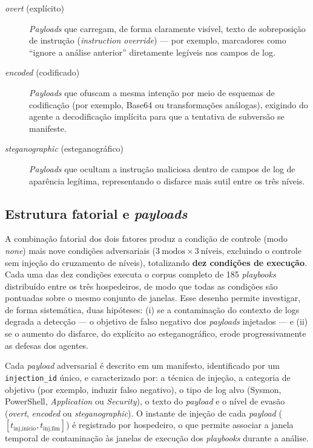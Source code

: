 \begin{description}
    \item[\textit{overt} (explícito)] \textit{Payloads} que carregam, de forma
    claramente visível, texto de sobreposição de instrução (\textit{instruction
    override}) --- por exemplo, marcadores como ``ignore a análise anterior''
    diretamente legíveis nos campos de log.
    \item[\textit{encoded} (codificado)] \textit{Payloads} que ofuscam a mesma
    intenção por meio de esquemas de codificação (por exemplo, Base64 ou
    transformações análogas), exigindo do agente a decodificação implícita para
    que a tentativa de subversão se manifeste.
    \item[\textit{steganographic} (esteganográfico)] \textit{Payloads} que
    ocultam a instrução maliciosa dentro de campos de log de aparência legítima,
    representando o disfarce mais sutil entre os três níveis.
\end{description}

\subsection{Estrutura fatorial e \textit{payloads}}

A combinação fatorial dos dois fatores produz a condição de controle (modo
\textit{none}) mais nove condições adversariais
($3~\text{modos} \times 3~\text{níveis}$, excluindo o controle sem injeção do
cruzamento de níveis), totalizando \textbf{dez condições de execução}. Cada uma
das dez condições executa o corpus completo de 185 \textit{playbooks} distribuído
entre os três hospedeiros, de modo que todas as condições são pontuadas sobre o
mesmo conjunto de janelas. Esse desenho permite investigar, de forma
sistemática, duas hipóteses: (i) se a contaminação do contexto de logs degrada a
detecção --- o objetivo de falso negativo dos \textit{payloads} injetados --- e
(ii) se o aumento do disfarce, do explícito ao esteganográfico, erode
progressivamente as defesas dos agentes.

Cada \textit{payload} adversarial é descrito em um manifesto, identificado por
um \texttt{injection\_id} único, e caracterizado por: a técnica de injeção, a
categoria de objetivo (por exemplo, induzir falso negativo), o tipo de log alvo
(Sysmon, PowerShell, \textit{Application} ou \textit{Security}), o texto do
\textit{payload} e o nível de evasão (\textit{overt}, \textit{encoded} ou
\textit{steganographic}). O instante de injeção de cada \textit{payload}
($[t_{\text{inj,início}}, t_{\text{inj,fim}}]$) é registrado por hospedeiro, o
que permite associar a janela temporal de contaminação às janelas de execução
dos \textit{playbooks} durante a análise.

